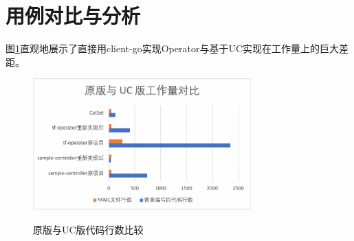 \documentclass[macfonts,master]{njuthesis}
\begin{document}
%
%
%
%
%

\section{用例对比与分析}


图\ref{fig:operator-cl}直观地展示了直接用client-go实现Operator与基于UC实现在工作量上的巨大差距。

\begin{figure}[htbp]
  \centering
  \includegraphics[width=0.75\textwidth]{pics/operator-line.pdf}\\
  \caption{原版与UC版代码行数比较}\label{fig:operator-cl}
\end{figure}
\end{document}
